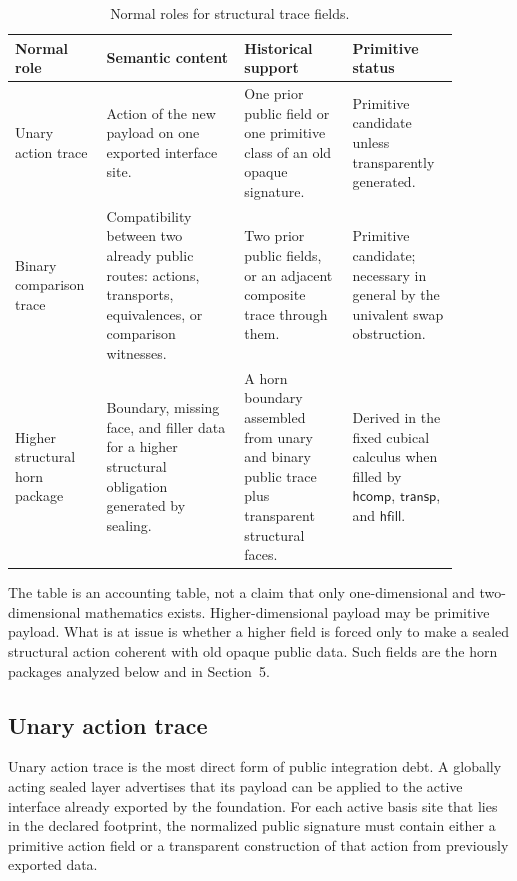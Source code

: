 \begin{table}[t]
\centering
\small
\setlength{\tabcolsep}{3pt}
\begin{tabular}{p{0.17\linewidth}p{0.28\linewidth}p{0.22\linewidth}p{0.21\linewidth}}
\hline
Normal role & Semantic content & Historical support & Primitive status \\
\hline
Unary action trace &
Action of the new payload on one exported interface site. &
One prior public field or one primitive class of an old opaque signature. &
Primitive candidate unless transparently generated. \\
\hline
Binary comparison trace &
Compatibility between two already public routes: actions, transports, equivalences, or
comparison witnesses. &
Two prior public fields, or an adjacent composite trace through them. &
Primitive candidate; necessary in general by the univalent swap obstruction. \\
\hline
Higher structural horn package &
Boundary, missing face, and filler data for a higher structural obligation generated by
sealing. &
A horn boundary assembled from unary and binary public trace plus transparent structural
faces. &
Derived in the fixed cubical calculus when filled by \(\mathsf{hcomp}\), \(\mathsf{transp}\),
and \(\mathsf{hfill}\). \\
\hline
\end{tabular}
\caption{Normal roles for structural trace fields.}
\end{table}

The table is an accounting table, not a claim that only one-dimensional and two-dimensional
mathematics exists.  Higher-dimensional payload may be primitive payload.  What is at issue
is whether a higher field is forced only to make a sealed structural action coherent with old
opaque public data.  Such fields are the horn packages analyzed below and in Section~5.

\subsection{Unary action trace}

Unary action trace is the most direct form of public integration debt.  A globally acting
sealed layer advertises that its payload can be applied to the active interface already
exported by the foundation.  For each active basis site that lies in the declared footprint,
the normalized public signature must contain either a primitive action field or a transparent
construction of that action from previously exported data.

